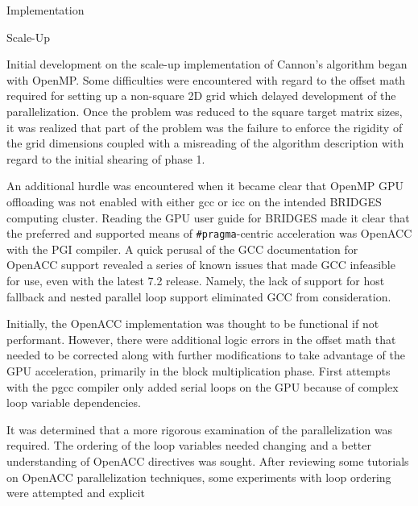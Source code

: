 \documentclass{article}
\begin{document}
\begin{section}{Implementation}
  \begin{subsection}{Scale-Up}
    \begin{paragraph}{}
      Initial development on the scale-up implementation of Cannon's algorithm began with OpenMP. Some difficulties were encountered with regard
      to the offset math required for setting up a non-square 2D grid which delayed development of the parallelization. Once the problem was
      reduced to the square target matrix sizes, it was realized that part of the problem was the failure to enforce the rigidity of the grid dimensions
      coupled with a misreading of the algorithm description with regard to the initial shearing of phase 1.
    \end{paragraph}
    \begin{paragraph}{}
      An additional hurdle was encountered when it became clear that OpenMP GPU offloading was not enabled with either gcc or icc on the intended
      BRIDGES computing cluster. Reading the GPU user guide for BRIDGES\autocite{BridgesGPUGuide} made it clear that the preferred and supported means of \texttt{\#pragma}-centric
      acceleration was OpenACC with the PGI compiler. A quick perusal of the GCC documentation for OpenACC support\autocite{gccOpenACC} revealed a series
      of known issues that made GCC infeasible for use, even with the latest 7.2 release. Namely, the lack of support for host fallback and nested
      parallel loop support eliminated GCC from consideration.
    \end{paragraph}
    \begin{paragraph}{}
      Initially, the OpenACC implementation was thought to be functional if not performant. However, there were additional logic errors in the
      offset math that needed to be corrected along with further modifications to take advantage of the GPU acceleration, primarily in the block
      multiplication phase. First attempts with the pgcc compiler only added serial loops on the GPU because of complex loop variable dependencies.
    \end{paragraph}
    \begin{paragraph}{}
      It was determined that a more rigorous examination of the parallelization was required. The ordering of the loop variables needed changing
      and a better understanding of OpenACC directives was sought.
      After reviewing some tutorials on OpenACC parallelization techniques, some experiments with loop ordering were attempted and explicit

\end{paragraph}
\end{subsection}
\end{section}
\end{document}
